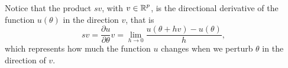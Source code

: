 Notice that the product $s v$, with $v \in \operatorname{\mathbb{R}}^p$, is the directional derivative of the function $u(\theta)$ in the direction $v$, that is 
\begin{equation}
    s v
    = 
    \frac{\partial u}{\partial \theta} v 
    = 
    \lim_{h \rightarrow 0} \frac{u(\theta + h v) - u(\theta)}{h},
    \label{eq:directional-derivative}
\end{equation}
which represents how much the function $u$ changes when we perturb $\theta$ in the direction of $v$. 



